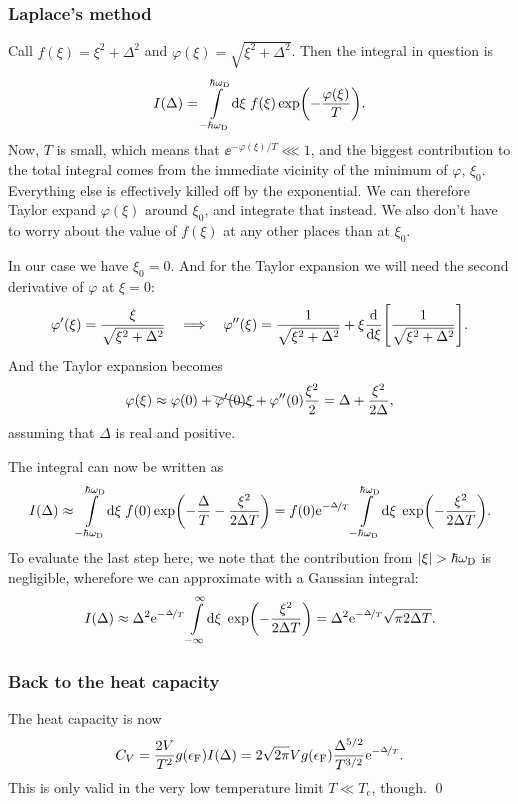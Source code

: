 \documentclass[11pt,letter, swedish, english
]{article}
\newcommand{\Tc}{\ensuremath{T_{\text{c}}}}
\newcommand{\eF}{\ensuremath{\epsilon_{\text{F}}}}
\newcommand{\wD}{\ensuremath{\omega_{\text{D}}}}
\begin{document}
\subsubsection*{Laplace's method}
Call $f(\xi)=\xi^2+\Delta^2$ and
$\varphi(\xi)=\sqrt{\xi^2+\Delta^2}$. Then the integral in question is
\begin{equation}
I(\Delta)=\int_{-\hbar\wD}^{\hbar\wD}\!\rd\xi\;f(\xi)\exp(-\frac{\varphi(\xi)}{T}).
\end{equation}
Now, $T$ is small, which means that $\ee^{-\varphi(\xi)/T}\lll1$, and
the biggest contribution to the total integral comes from the
immediate vicinity of the minimum of $\varphi$, $\xi_0$. Everything else is
effectively killed off by the exponential. 
We can therefore Taylor expand $\varphi(\xi)$ around $\xi_0$, and
integrate that instead. 
We also don't have to worry about the value of $f(\xi)$ at any other
places than at $\xi_0$.

In our case we have $\xi_0=0$. And for the Taylor expansion we will
need the second derivative of $\varphi$ at $\xi=0$:
\begin{equation}
\varphi'(\xi)=\frac{\xi}{\sqrt{\xi^2+\Delta^2}}
\quad\Longrightarrow\quad
\varphi''(\xi)=\frac{1}{\sqrt{\xi^2+\Delta^2}}
+\xi\dv{\xi}\qty[\frac{1}{\sqrt{\xi^2+\Delta^2}}].
\end{equation}
And the Taylor expansion becomes
\begin{equation}
\varphi(\xi)\approx \varphi(0)+\bcancel{\varphi'(0)\xi}
+\varphi''(0)\frac{\xi^2}{2}
=\Delta+\frac{\xi^2}{2\Delta},
\end{equation}
assuming that $\Delta$ is real and positive.

The integral can now be written as
\begin{equation}
I(\Delta)\approx\int_{-\hbar\wD}^{\hbar\wD}\!\rd\xi\;f(0)
\exp(-\frac{\Delta}{T} - \frac{\xi^2}{2\Delta T})
=f(0)\ee^{-\nicefrac{\Delta}{T}}\int_{-\hbar\wD}^{\hbar\wD}\!\rd\xi\;
\exp(-\frac{\xi^2}{2\Delta T}).
\end{equation}
To evaluate the last step here, we note that the contribution from
$\abs{\xi}>\hbar\wD$ is negligible, wherefore we can approximate with a
Gaussian integral:
\begin{equation}
I(\Delta)\approx \Delta^2\ee^{-\nicefrac{\Delta}{T}}
\int_{-\infty}^{\infty}\!\rd\xi\;
\exp(-\frac{\xi^2}{2\Delta T})
=\Delta^2\ee^{-\nicefrac{\Delta}{T}}
\sqrt{\pi2\Delta T}.
\end{equation}

\subsubsection*{Back to the heat capacity}
The heat capacity is now 
\begin{equation}\label{eq:1b_Cv}
C_V=\frac{2V}{T^2}g(\eF)I(\Delta)
=2\sqrt{2\pi}Vg(\eF)\frac{\Delta^{5/2}}{T^{3/2}}
\ee^{-\nicefrac{\Delta}{T}}.
\end{equation}
This is only valid in the very low temperature limit $T\ll\Tc$,
though. 
\qed
\end{document}
